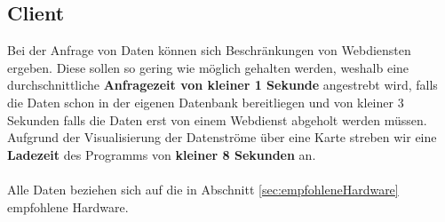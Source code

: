 \subsection{Client}
Bei der Anfrage von Daten können sich Beschränkungen von Webdiensten ergeben. Diese sollen so gering wie möglich gehalten werden, weshalb eine durchschnittliche \textbf{Anfragezeit von kleiner 1 Sekunde} angestrebt wird, falls die Daten schon in der eigenen Datenbank bereitliegen und von kleiner 3 Sekunden falls die Daten erst von einem Webdienst abgeholt werden müssen.
Aufgrund der Visualisierung der Datenströme über eine Karte streben wir eine \textbf{Ladezeit} des Programms von \textbf{kleiner 8 Sekunden} an.\\\\
Alle Daten beziehen sich auf die in Abschnitt \ref{sec:empfohleneHardware} empfohlene Hardware.